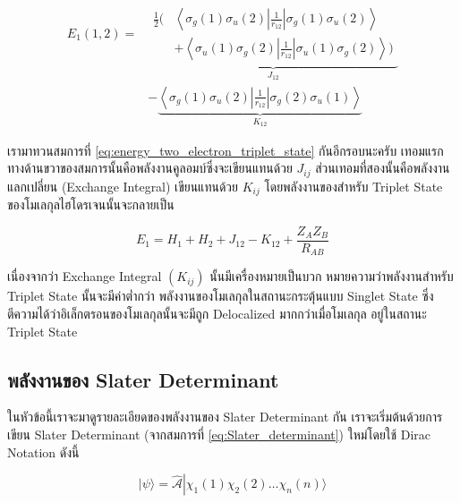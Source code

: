\begin{equation}
    \label{eq:energy_two_electron_triplet_state}
    \begin{aligned}
        E_1(1,2) 
        = & 
        \underbrace{
            \begin{aligned}
                \frac{1}{2}
                \biggl( & \left\langle\sigma_g(1) \sigma_u(2)\left|\frac{1}{r_{12}}\right| \sigma_g(1) \sigma_u(2)\right\rangle \\
                & +  \left\langle\sigma_u(1) \sigma_g(2)\left|\frac{1}{r_{12}}\right| \sigma_u(1) \sigma_g(2)\right\rangle \biggl)
            \end{aligned}
            }_{J_{12}} \\
        & -\underbrace{
            \left\langle\sigma_g(1) \sigma_u(2)\left|\frac{1}{r_{12}}\right| \sigma_g(2) \sigma_u(1)\right\rangle}
            _{K_{12}}
    \end{aligned}
\end{equation}

เรามาทวนสมการที่ \ref{eq:energy_two_electron_triplet_state} กันอีกรอบนะครับ เทอมแรกทางด้านขวาของสมการนั้นคือพลังงานคูลอมบ์ซึ่งจะเขียนแทนด้วย 
$J_{i j}$ ส่วนเทอมที่สองนั้นคือพลังงานแลกเปลี่ยน (Exchange Integral) เขียนแทนด้วย $K_{i j}$ โดยพลังงานของสำหรับ Triplet 
State ของโมเลกุลไฮโดรเจนนั้นจะกลายเป็น

\begin{equation}
    E_1 = H_1 + H_2 + J_{12} - K_{12} + \frac{Z_A Z_B}{R_{A B}}
\end{equation}

เนื่องจากว่า Exchange Integral $(K_{i j})$ นั้นมีเครื่องหมายเป็นบวก หมายความว่าพลังงานสำหรับ Triplet State นั้นจะมีค่าต่ำกว่า%
พลังงานของโมเลกุลในสถานะกระตุ้นแบบ Singlet State ซึ่งตีความได้ว่าอิเล็กตรอนของโมเลกุลนั้นจะมีถูก Delocalized มากกว่าเมื่อโมเลกุล%
อยู่ในสถานะ Triplet State

\subsection{พลังงานของ Slater Determinant}

ในหัวข้อนี้เราจะมาดูรายละเอียดของพลังงานของ Slater Determinant กัน เราจะเริ่มต้นด้วยการเขียน Slater Determinant (จากสมการที่ 
\ref{eq:Slater_determinant}) ใหม่โดยใช้ Dirac Notation ดังนี้

\begin{equation}
    \label{eq:Slater_determinant_simple}
    |\psi\rangle 
    =
    \hat{\mathscr{A}} \left|\right. \chi_1(1) \chi_2(2) \ldots \chi_n(n)\bigr\rangle
\end{equation}

